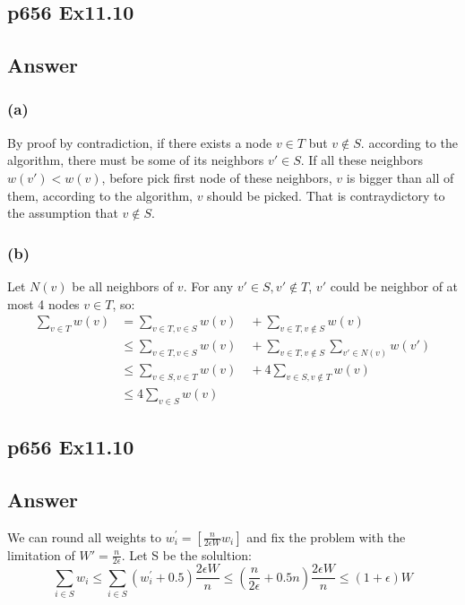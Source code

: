 \documentclass[a4paper]{article}
\begin{document}
\subsection*{p656 Ex11.10}
\subsection*{ Answer}
\subsubsection*{(a)}
	By proof by contradiction, if there exists a node $v \in T$ but $v \notin S$. according to the algorithm, there must be some of its neighbors $v' \in S$. If all these neighbors $w(v')<w(v)$, before  pick first node of these neighbors, $v$ is bigger than all of them, according to the algorithm, $v$ should be picked. That is contraydictory to the assumption that $v \notin S$.
\subsubsection*{(b)}
Let $N(v)$ be all neighbors of $v$. For any $v'\in S, v'\notin T$, $v'$ could be neighbor of at most 4 nodes $v \in T$, so:
	$$
	\begin{aligned}
	\sum_{v\in T} w(v) &=  \sum_{v\in T, v\in S}w(v) \quad + \sum_{v\in T, v\notin S}w(v) \\
	&\leq \sum_{v\in T, v\in S}w(v) \quad + \sum_{v\in T, v\notin S}\sum_{v'\in N(v)}w(v') \\
	&\leq \sum_{v\in S, v\in T}w(v) \quad + 4\sum_{v\in S, v\notin T}w(v)\\
	&\leq 4\sum_{v\in S} w(v)
	\end{aligned}
	$$
	\vspace*{2cm}

\subsection*{p656 Ex11.10}
\subsection*{ Answer}
We can round all weights to $w_{i}^{'}=[\frac{n}{2\epsilon W}w_i]$ and fix the problem with the limitation of $W'=\frac{n}{2\epsilon}$. Let S be the solultion:
	$$
	\sum_{i\in S}w_i \leq \sum_{i\in S}{(w_{i}^{'}+0.5)\frac{2\epsilon W}{n}}
	\leq (\frac{n}{2\epsilon}+0.5n)\frac{2\epsilon W}{n} \leq (1+\epsilon)W
	$$
\vspace*{2cm}
\end{document}
